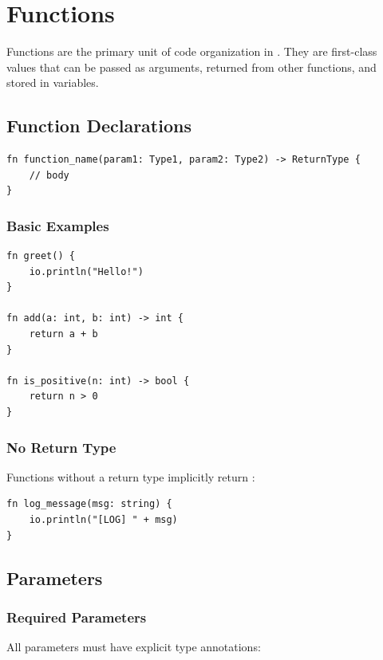 \chapter{Functions}
\label{ch:functions}

Functions are the primary unit of code organization in \haira{}. They are first-class values that can be passed as arguments, returned from other functions, and stored in variables.

\section{Function Declarations}

\begin{lstlisting}
fn function_name(param1: Type1, param2: Type2) -> ReturnType {
    // body
}
\end{lstlisting}

\subsection{Basic Examples}

\begin{lstlisting}
fn greet() {
    io.println("Hello!")
}

fn add(a: int, b: int) -> int {
    return a + b
}

fn is_positive(n: int) -> bool {
    return n > 0
}
\end{lstlisting}

\subsection{No Return Type}

Functions without a return type implicitly return \code{()}:

\begin{lstlisting}
fn log_message(msg: string) {
    io.println("[LOG] " + msg)
}
\end{lstlisting}

\section{Parameters}

\subsection{Required Parameters}

All parameters must have explicit type annotations:

